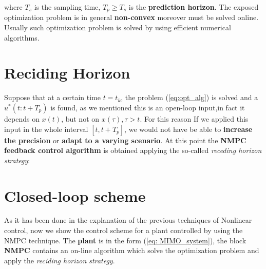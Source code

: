 where $T_s$  is the sampling time, $T_p\ge T_s$ is the \textbf{prediction horizon}. The exposed optimization problem is in general \textbf{non-convex} moreover must be solved online. Usually such optimization problem is solved by using efficient numerical algorithms. 

\section{Reciding Horizon}
Suppose that at a certain time $t=t_k$, the problem (\ref{eq:opt_alg}) is solved and a $u^*
(t:t+T_p)$ is found, as we mentioned this is an open-loop input,in fact it depends on $x(t)$, but not on $x(\tau), \tau>t$. For this reason If we applied this input in the whole interval $[t, t+T_p]$, we would not have be able to \textbf{increase the precision} or \textbf{adapt to a varying scenario}. At this point the \textbf{NMPC feedback control algorithm} is obtained applying the so-called \textit{receding horizon strategy}:\\

\hspace*{-5mm}
%


 
\section{Closed-loop scheme}
As it has been done in the explanation of the previous techniques of Nonlinear control, now we show the control scheme for a plant controlled by using the NMPC technique. 
The \textbf{plant} is in the form (\ref{eq: MIMO_system}), the block \textbf{NMPC} contains an on-line algorithm which solve the optimization problem and apply the \textit{reciding horizon strategy}.

